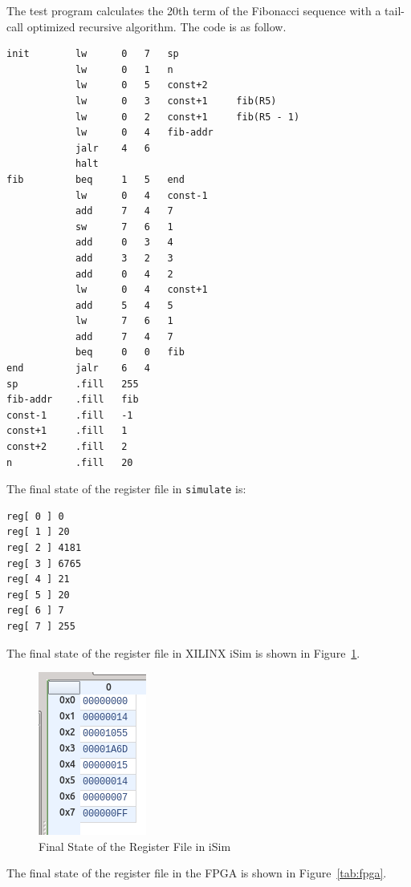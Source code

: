 \documentclass[a4paper]{article}
\begin{document}
The test program calculates the 20th term of the Fibonacci sequence with a tail-call optimized recursive
algorithm. The code is as follow.
\begin{verbatim}
init        lw      0   7   sp
            lw      0   1   n
            lw      0   5   const+2
            lw      0   3   const+1     fib(R5)
            lw      0   2   const+1     fib(R5 - 1)
            lw      0   4   fib-addr
            jalr    4   6
            halt
fib         beq     1   5   end
            lw      0   4   const-1
            add     7   4   7
            sw      7   6   1
            add     0   3   4
            add     3   2   3
            add     0   4   2
            lw      0   4   const+1
            add     5   4   5
            lw      7   6   1
            add     7   4   7
            beq     0   0   fib
end         jalr    6   4
sp          .fill   255
fib-addr    .fill   fib
const-1     .fill   -1
const+1     .fill   1
const+2     .fill   2
n           .fill   20
\end{verbatim}
\newpage
The final state of the register file in \verb|simulate| is:
\begin{verbatim}
reg[ 0 ] 0
reg[ 1 ] 20
reg[ 2 ] 4181
reg[ 3 ] 6765
reg[ 4 ] 21
reg[ 5 ] 20
reg[ 6 ] 7
reg[ 7 ] 255
\end{verbatim}

The final state of the register file in XILINX iSim is shown in Figure~\ref{fig:isim}.
\begin{figure}[ht!]
    \center
    \includegraphics[scale=0.6]{isim}
    \caption{Final State of the Register File in iSim}\label{fig:isim}
\end{figure}

The final state of the register file in the FPGA is shown in Figure~\ref{tab:fpga}.
\end{document}
